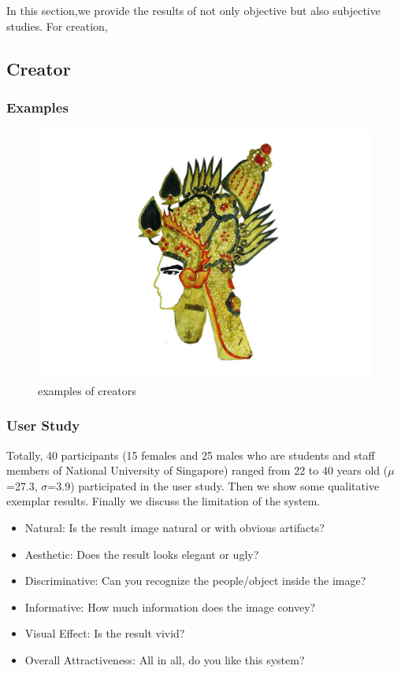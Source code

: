 \documentclass[letter]{sig-alternate}
\begin{document}
In this section,we provide the results of not only objective but also subjective studies. For creation,



\subsection{Creator}




\subsubsection{Examples}


\begin{figure}[t]
\begin{center}
\includegraphics[scale=0.4]{figure/result_example.pdf}
\caption{\small{examples of creators}}
\label{fig:firstfig}
\end{center}
\end{figure}


\subsubsection{User Study}

Totally, 40 participants (15 females and 25 males who are students and staff members of National University of Singapore) ranged from 22 to 40 years old ($\mu$=27.3, $\sigma$=3.9) participated in the user study. Then we show some qualitative exemplar results. Finally we discuss the limitation of the system. 


\begin{itemize}
    \item Natural: Is the result image natural or with obvious artifacts? 
    \item Aesthetic: Does the result looks elegant or ugly? 
    \item Discriminative: Can you recognize the people/object inside the image?
    \item Informative: How much information does the image convey?
    \item Visual Effect: Is the result vivid? 
    \item Overall Attractiveness: All in all, do you like this system?
\end{itemize}
\end{document}
